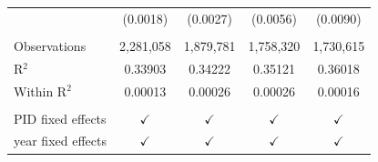 \begin{tabular}{lcccc}
                         & (0.0018)       & (0.0027)               & (0.0056)          & (0.0090)\\   
    \\
   Observations          & 2,281,058      & 1,879,781              & 1,758,320         & 1,730,615\\  
   R$^2$                 & 0.33903        & 0.34222                & 0.35121           & 0.36018\\  
   Within R$^2$          & 0.00013        & 0.00026                & 0.00026           & 0.00016\\  
    \\
   PID fixed effects     & $\checkmark$   & $\checkmark$           & $\checkmark$      & $\checkmark$\\   
   year fixed effects    & $\checkmark$   & $\checkmark$           & $\checkmark$      & $\checkmark$\\   
   \bottomrule
\end{tabular}
\par\endgroup


